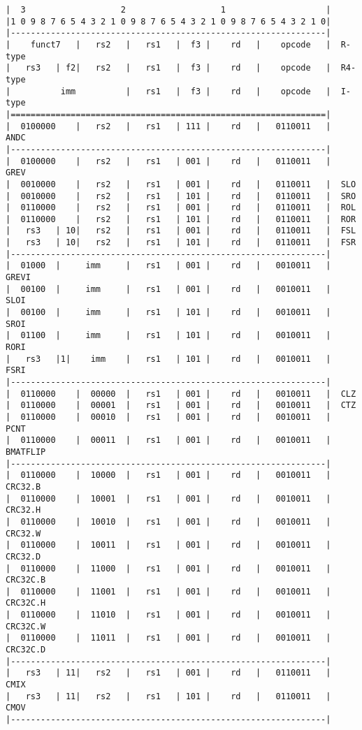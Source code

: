 \begin{minipage}{\linewidth}
\begin{verbatim}
|  3                   2                   1                    |
|1 0 9 8 7 6 5 4 3 2 1 0 9 8 7 6 5 4 3 2 1 0 9 8 7 6 5 4 3 2 1 0|
|---------------------------------------------------------------|
|    funct7   |   rs2   |   rs1   |  f3 |    rd   |    opcode   |  R-type
|   rs3   | f2|   rs2   |   rs1   |  f3 |    rd   |    opcode   |  R4-type
|          imm          |   rs1   |  f3 |    rd   |    opcode   |  I-type
|===============================================================|
|  0100000    |   rs2   |   rs1   | 111 |    rd   |   0110011   |  ANDC
|---------------------------------------------------------------|
|  0100000    |   rs2   |   rs1   | 001 |    rd   |   0110011   |  GREV
|  0010000    |   rs2   |   rs1   | 001 |    rd   |   0110011   |  SLO
|  0010000    |   rs2   |   rs1   | 101 |    rd   |   0110011   |  SRO
|  0110000    |   rs2   |   rs1   | 001 |    rd   |   0110011   |  ROL
|  0110000    |   rs2   |   rs1   | 101 |    rd   |   0110011   |  ROR
|   rs3   | 10|   rs2   |   rs1   | 001 |    rd   |   0110011   |  FSL
|   rs3   | 10|   rs2   |   rs1   | 101 |    rd   |   0110011   |  FSR
|---------------------------------------------------------------|
|  01000  |     imm     |   rs1   | 001 |    rd   |   0010011   |  GREVI
|  00100  |     imm     |   rs1   | 001 |    rd   |   0010011   |  SLOI
|  00100  |     imm     |   rs1   | 101 |    rd   |   0010011   |  SROI
|  01100  |     imm     |   rs1   | 101 |    rd   |   0010011   |  RORI
|   rs3   |1|    imm    |   rs1   | 101 |    rd   |   0010011   |  FSRI
|---------------------------------------------------------------|
|  0110000    |  00000  |   rs1   | 001 |    rd   |   0010011   |  CLZ
|  0110000    |  00001  |   rs1   | 001 |    rd   |   0010011   |  CTZ
|  0110000    |  00010  |   rs1   | 001 |    rd   |   0010011   |  PCNT
|  0110000    |  00011  |   rs1   | 001 |    rd   |   0010011   |  BMATFLIP
|---------------------------------------------------------------|
|  0110000    |  10000  |   rs1   | 001 |    rd   |   0010011   |  CRC32.B
|  0110000    |  10001  |   rs1   | 001 |    rd   |   0010011   |  CRC32.H
|  0110000    |  10010  |   rs1   | 001 |    rd   |   0010011   |  CRC32.W
|  0110000    |  10011  |   rs1   | 001 |    rd   |   0010011   |  CRC32.D
|  0110000    |  11000  |   rs1   | 001 |    rd   |   0010011   |  CRC32C.B
|  0110000    |  11001  |   rs1   | 001 |    rd   |   0010011   |  CRC32C.H
|  0110000    |  11010  |   rs1   | 001 |    rd   |   0010011   |  CRC32C.W
|  0110000    |  11011  |   rs1   | 001 |    rd   |   0010011   |  CRC32C.D
|---------------------------------------------------------------|
|   rs3   | 11|   rs2   |   rs1   | 001 |    rd   |   0110011   |  CMIX
|   rs3   | 11|   rs2   |   rs1   | 101 |    rd   |   0110011   |  CMOV
|---------------------------------------------------------------|
\end{verbatim}
\end{minipage}

